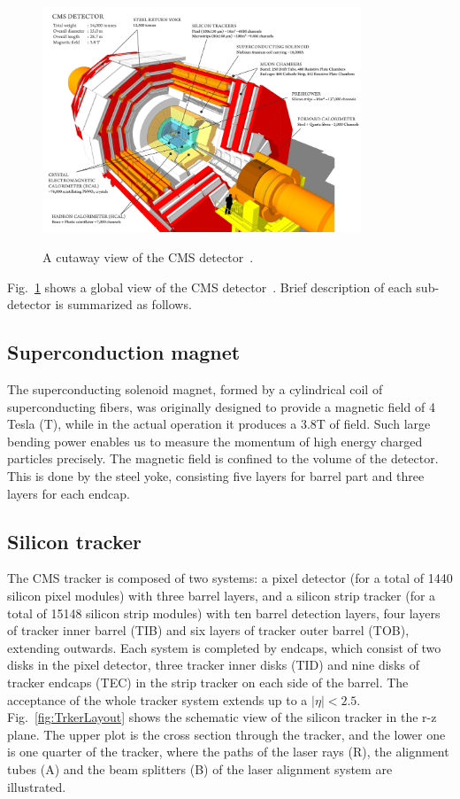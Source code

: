 \begin{figure}[!ht]
  \begin{center}
    \includegraphics[width=0.85\textwidth]{Fig/cms_120918_03}\\
    \caption{A cutaway view of the CMS detector~\cite{Sakuma:1626816}. \label{fig:CMSdetector}}
  \end{center}
\end{figure}
Fig.~\ref{fig:CMSdetector} shows a global view of the CMS detector~\cite{Sakuma:1626816}. Brief description of each sub-detector is summarized as follows.

\subsection*{Superconduction magnet}
The superconducting solenoid magnet, formed by a cylindrical coil of superconducting fibers, was originally designed to provide a magnetic field of 4 Tesla (T), while in the actual operation it produces a 3.8\unit{T} of field. Such large bending power enables us to measure the momentum of high energy charged particles precisely. 
The magnetic field is confined to the volume of the detector. This is done by the steel yoke, consisting five layers for barrel part and three layers for each endcap. 
\subsection*{Silicon tracker}
The CMS tracker is composed of two systems: a pixel detector (for a total of 1440 silicon pixel modules) with three barrel layers, and a silicon strip tracker (for a total of 15148 silicon strip modules) with ten barrel detection layers, four layers of tracker inner barrel (TIB) and six layers of tracker outer barrel (TOB), extending outwards. 
Each system is completed by endcaps, which consist of two disks in the pixel detector, three tracker inner disks (TID) and nine disks of tracker endcaps (TEC) in the strip tracker on each side of the barrel. The acceptance of the whole tracker system extends up to a $|\eta|<2.5$. 
Fig.~\ref{fig:TrkerLayout} shows the schematic view of the silicon tracker in the r-z plane. The upper plot is the cross section through the tracker, and the lower one is one quarter of the tracker, where the paths of the laser rays (R), the alignment tubes (A) and the beam splitters (B) of the laser alignment system are illustrated.

